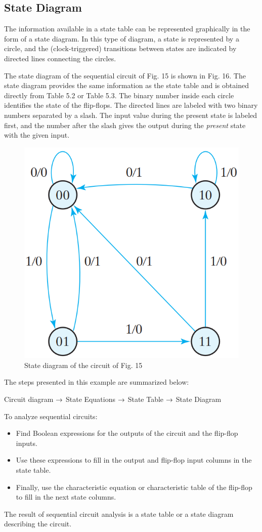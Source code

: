 \subsection{State Diagram}
\label{subsec:state-diagram}

The information available in a state table can be represented graphically in the form of a state diagram. In this type of diagram, a state is represented by a circle, and the (clock-triggered) transitions between states are indicated by directed lines connecting the circles.

The state diagram of the sequential circuit of Fig. 15 is shown in Fig. 16. The state diagram provides the same information as the state table and is obtained directly from Table 5.2 or Table 5.3. The binary number inside each circle identifies the state of the flip-flops. The directed lines are labeled with two binary numbers separated by a slash. The input value during the present state is labeled first, and the number after the slash gives the output during the \textit{present} state with the given input.
\begin{figure}[H]
  \centering
  \includegraphics[width=.5\linewidth]{img/fig-5.16.png}
  \caption{State diagram of the circuit of Fig. 15}
  \label{fig:5.16}
\end{figure}

\noindent The steps presented in this example are summarized below:
\begin{center}
  Circuit diagram $\rightarrow$ State Equations $\rightarrow$ State Table $\rightarrow$ State Diagram
\end{center}

\noindent To analyze sequential circuits:
\begin{itemize}
  \item Find Boolean expressions for the outputs of the circuit and the flip-flop inputs.
  \item Use these expressions to fill in the output and flip-flop input columns in the state table.
  \item Finally, use the characteristic equation or characteristic table of the flip-flop to fill in the next state columns.
\end{itemize}
The result of sequential circuit analysis is a state table or a state diagram describing the circuit.

